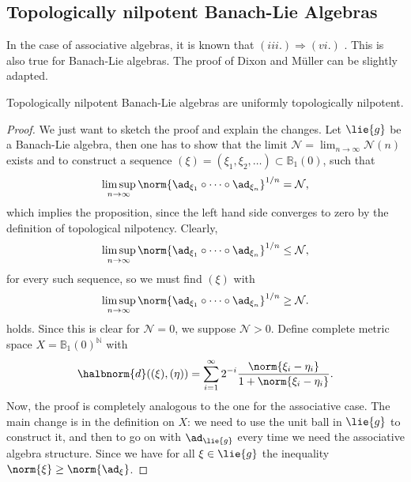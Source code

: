 \documentclass[
11pt,                          %
english                        %
]{article}
\begin{document}
\subsection{Topologically nilpotent Banach-Lie Algebras}
In the case of associative algebras, it is known that $(iii.) \Longrightarrow 
(vi.)$ \cite{dixon.mueller:}. This is also true for Banach-Lie algebras.
The proof of Dixon and M\"uller can be slightly adapted.
\begin{proposition}
	Topologically nilpotent Banach-Lie algebras are uniformly topologically 
	nilpotent.
\end{proposition}
\begin{proof}
	We just want to sketch the proof and explain the changes.
	Let $\lie{g}$ be a Banach-Lie algebra, then one has to show that the limit 
	$\mathcal{N} = \lim_{n \rightarrow \infty} \mathcal{N}(n)$ exists and to 
	construct a sequence $(\xi) = (\xi_1, \xi_2, \ldots) \subset \mathbb{B}_1(0)$, 
	such that
	\begin{equation*}
		\limsup_{n \rightarrow \infty}
		\norm{\ad_{\xi_1} \circ \cdots \circ \ad_{\xi_n} }^{1/n}
		=
		\mathcal{N},
	\end{equation*}
	which implies the proposition, since the left hand side converges to zero by 
	the definition of topological nilpotency. Clearly,
	\begin{equation*}
		\limsup_{n \rightarrow \infty}
		\norm{\ad_{\xi_1} \circ \cdots \circ \ad_{\xi_n} }^{1/n}
		\leq
		\mathcal{N},
	\end{equation*}
	for every such sequence, so we must find $(\xi)$ with
	\begin{equation*}
		\limsup_{n \rightarrow \infty}
		\norm{\ad_{\xi_1} \circ \cdots \circ \ad_{\xi_n} }^{1/n}
		\geq
		\mathcal{N}.
	\end{equation*}
	holds. Since this is clear for $\mathcal{N} = 0$, we suppose $\mathcal{N} > 0$.
	Define complete metric space $X = \mathbb{B}_1(0)^{\mathbb{N}}$ with
	\begin{equation*}
		\halbnorm{d}((\xi), (\eta))
		=
		\sum\limits_{i = 1}^\infty
		2^{-i} \frac{\norm{\xi_i - \eta_i}}{1 + \norm{\xi_i - \eta_i}}.
	\end{equation*}
	Now, the proof is completely analogous to the one for the associative case.
	The main change is in the definition on $X$: we need to use the unit ball in 
	$\lie{g}$ to construct it, and then to go on with $\ad_{\lie{g}}$ every time
	we need the associative algebra structure. Since we have for all $\xi \in 
	\lie{g}$ the inequality $\norm{\xi} \geq \norm{\ad_{\xi}}$. 

\end{proof}
\end{document}
